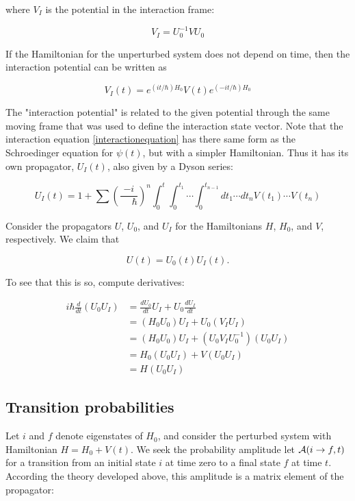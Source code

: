 where $V_I$ is the potential in the interaction frame:

\begin{equation}
V_I = U_0^{-1} V U_0
\end{equation}

If the Hamiltonian for the unperturbed system does not depend on time, then the interaction potential can be written as

\begin{equation}
V_I(t) = e^{(it/\hbar)H_0} V(t) e^{(-it/\hbar)H_0}
\end{equation}

The "interaction potential" is related to the given potential through the same moving frame that was used to define the interaction state vector.
Note that the interaction equation \eqref{interactionequation} has there same form as the Schroedinger equation for $\psi(t)$, but with a simpler Hamiltonian.  Thus it has its own propagator, $U_I(t)$, also given by a Dyson series:

\begin{equation}
\label{interactionseries}
U_I(t) = 1 + \sum \left(\frac{-i}{\phantom{-}\hbar}\right)^n \int_0^t \int_0^{t_1}\cdots \int_0^{t_{n-1}} dt_1 \cdots dt_n V(t_1) \cdots V(t_n)
\end{equation}


Consider the propagators $U$, $U_0$, and $U_I$ for the Hamiltonians $H$, $H_0$, and $V$, respectively. We claim that

\begin{equation}
U(t) = U_0(t)U_I(t).
\end{equation}

To see that this is so, compute derivatives:

\begin{align}
i\hbar \frac{d}{dt}(U_0U_I) &= \frac{dU_0}{dt} U_I + U_0\frac{dU_I}{dt} \\
&= (H_0U_0)U_I + U_0 (V_I U_I) \\
&= (H_0U_0)U_I + (U_0 V_I U_0^{-1})( U_0 U_I) \\
&=  H_0(U_0U_I) + V( U_0 U_I) \\
&= H(U_0U_I)
\end{align}



\subsection{Transition probabilities}

Let $i$ and $f$ denote eigenstates of $H_0$, and consider the perturbed system with Hamiltonian $H = H_0 + V(t)$.  We seek the probability amplitude  let $\mathcal{A}(i \to f, t)$ for a transition from an initial state $i$ at time zero to a final state  $f$ at time $t$.  According the theory developed above, this amplitude is a matrix element of the propagator:


